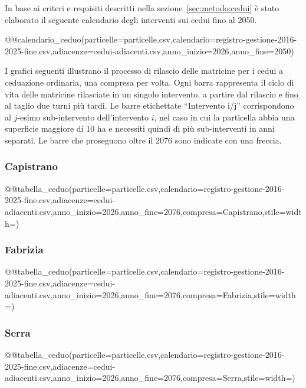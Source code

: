 In base ai criteri e requisiti descritti nella sezione~\ref{sec:metodo:cedui} è stato
elaborato il seguente calendario degli interventi sui cedui fino al 2050.

@@calendario_ceduo(particelle=particelle.csv,calendario=registro-gestione-2016-2025-fine.csv,adiacenze=cedui-adiacenti.csv,anno_inizio=2026,anno_fine=2050)

I grafici seguenti illustrano il processo di rilascio delle matricine per i cedui a ceduazione ordinaria, una compresa per volta. Ogni barra rappresenta il ciclo di vita delle matricine rilasciate in un singolo intervento, a partire dal rilascio e fino al taglio due turni più tardi. Le barre etichettate ``Intervento i/j'' corrispondono al $j$-esimo sub-intervento dell'intervento $i$, nel caso in cui la particella abbia una superficie maggiore di 10 ha e necessiti quindi di più sub-interventi in anni separati. Le barre che proseguono oltre il 2076 sono indicate con una freccia.

\subsubsection*{Capistrano}
@@tabella_ceduo(particelle=particelle.csv,calendario=registro-gestione-2016-2025-fine.csv,adiacenze=cedui-adiacenti.csv,anno_inizio=2026,anno_fine=2076,compresa=Capistrano,stile=width=\textwidth)
\clearpage

\subsubsection*{Fabrizia}
@@tabella_ceduo(particelle=particelle.csv,calendario=registro-gestione-2016-2025-fine.csv,adiacenze=cedui-adiacenti.csv,anno_inizio=2026,anno_fine=2076,compresa=Fabrizia,stile=width=\textwidth)

\subsubsection*{Serra}
@@tabella_ceduo(particelle=particelle.csv,calendario=registro-gestione-2016-2025-fine.csv,adiacenze=cedui-adiacenti.csv,anno_inizio=2026,anno_fine=2076,compresa=Serra,stile=width=\textwidth)
\clearpage

